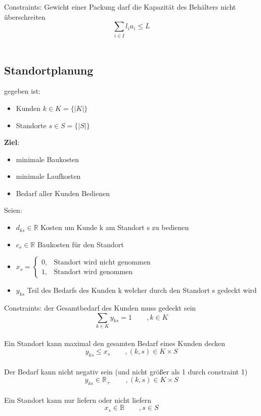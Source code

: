 \documentclass[12pt,a4paper, hyperref]{article}
\begin{document}
\flushleft Constraints:
\flushleft Gewicht einer Packung darf die Kapazität des Behälters nicht überschreiten
\[ \sum_{i\in I} l_{i}a_{i} \leq L \]\\

\subsection{Standortplanung}
gegeben ist:
\begin{itemize}
\item Kunden $k \in K = \{|K|\}$
\item Standorte $s \in S = \{|S|\}$
\end{itemize}
\textbf{Ziel}: 
\begin{itemize}
\item minimale Baukosten
\item minimale Laufkosten
\item Bedarf aller Kunden Bedienen
\end{itemize}
Seien: \begin{itemize}
\item $d_{ks} \in \mathbb{R}$ Kosten um Kunde k am Standort s zu bedienen
\item $c_s \in  \mathbb{R}$ Baukosten für den Standort
\item $x_s = \begin{cases}
0, & \text{Standort wird nicht genommen} \\
1, & \text{Standort wird genommen}
\end{cases}$
\item $y_{ks}$ Teil des Bedarfs des Kunden k welcher durch den Standort s gedeckt wird
\end{itemize}

\flushleft Constraints:
\flushleft der Gesamtbedarf des Kunden muss gedeckt sein
\[ \sum_{k\in K}y_{ks} = 1\hspace{25pt} ,k\in K \]\\

\flushleft Ein Standort kann maximal den gesamten Bedarf eines Kunden decken
\[y_{ks} \leq x_s\hspace{25pt} , (k,s) \in K\times S  \]\\

\flushleft Der Bedarf kann nicht negativ sein (und nicht größer als 1 durch constraint 1)
\[ y_{ks} \in \mathbb{R}_+\hspace{25pt} , (k,s) \in K\times S \]\\

\flushleft Ein Standort kann nur liefern oder nicht liefern
\[ x_s \in \mathbb{B}\hspace{25pt} , s\in S \]\\
\end{document}
